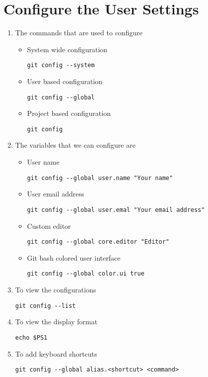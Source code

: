 \documentclass[paper=a4, fontsize=12pt]{scrartcl}
\begin{document}
\section*{Configure the User Settings}
\begin{enumerate}
\item The commands that are used to configure
\begin{itemize}
\item System wide configuration
\begin{lstlisting}
git config --system
\end{lstlisting}
\item User based configuration
\begin{lstlisting}
git config --global
\end{lstlisting}
\item Project based configuration
\begin{lstlisting}
git config
\end{lstlisting}
\end{itemize}
\item The variables that we can configure are
\begin{itemize}
\item User name
\begin{lstlisting}
git config --global user.name "Your name"
\end{lstlisting}
\item User email address
\begin{lstlisting}
git config --global user.emal "Your email address"
\end{lstlisting}
\item Custom editor
\begin{lstlisting}
git config --global core.editor "Editor"
\end{lstlisting}
\item Git bash colored user interface
\begin{lstlisting}
git config --global color.ui true
\end{lstlisting}
\end{itemize}
\item To view the configurations
\begin{lstlisting}
git config --list
\end{lstlisting}
\item To view the display format
\begin{lstlisting}
echo $PS1
\end{lstlisting}
\item To add keyboard shortcuts
\begin{lstlisting}
git config --global alias.<shortcut> <command>
\end{lstlisting}
\end{enumerate}
\end{document}
